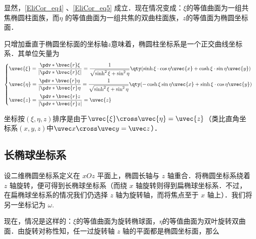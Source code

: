 显然，\autoref{EliCor_eq4} 、\autoref{EliCor_eq5} 成立．现在情况变成：$\xi$的等值曲面为一组共焦椭圆柱面族，而$\eta$ 的等值曲面为一组共焦的双曲柱面族，$z$的等值面为椭圆坐标面．

只增加垂直于椭圆坐标面的坐标轴$z$意味着，椭圆柱坐标系是一个正交曲线坐标系．其单位矢量为
\begin{equation}
\left\{
    \begin{aligned}
    &\uvec{\xi}=\frac{\pdv*{\bvec{r}}{\xi}}{|\pdv*{\bvec{r}}{\xi}|}=\frac{1}{\sqrt{\sinh^2\xi+\sin^2\eta}}\qty(\sinh\xi\cdot\cos\eta\uvec{x}+\cosh\xi\cdot\sin\eta\uvec{y})\\
    &\uvec{\eta }=\frac{\pdv*{\bvec{r}}{\eta}}{|\pdv*{\bvec{r}}{\eta}}=\frac{1}{\sqrt{\sinh^2\xi+\sin^2\eta}}\qty(-\cosh\xi\sin\eta\uvec{x}+\sinh\xi\cdot\cos\eta\uvec{y})\\
    &\uvec{z}=\frac{\pdv*{\bvec{r}}{z}}{|\pdv*{\bvec{r}}{z}|}=\uvec{z}
    \end{aligned}\right.
\end{equation}

坐标按$(\xi,\eta,z)$排序是由于$\uvec{\xi}\cross\uvec{\eta}=\uvec{z}$（类比直角坐标系$(x,y,z)$中$\uvec x\cross\uvec y=\uvec z$）．
\subsection{长椭球坐标系}
设二维椭圆坐标系定义在 $xOz$ 平面上，椭圆长轴与 $z$ 轴重合．将椭圆坐标系绕着 $z$ 轴旋转，便可得到长椭球坐标系（而绕 $x$ 轴旋转则得到扁椭球坐标系．不过，在扁椭球坐标系的情况我们仍选择 $z$ 轴为旋转轴，而将焦点至于 $x$ 轴上）．我们将另一坐标记为 $\omega$.

现在，情况是这样的：$\xi$的等值曲面为旋转椭球面，$\eta$的等值曲面为双叶旋转双曲面．由旋转对称性知，任一过旋转轴 $z$ 轴的平面都是椭圆坐标面，那么$$

